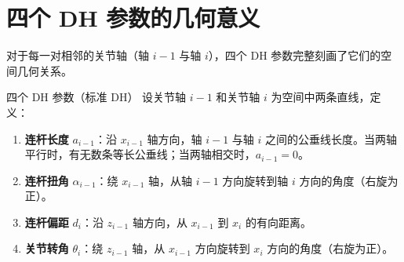 \section{四个 DH 参数的几何意义}

对于每一对相邻的关节轴（轴 $i-1$ 与轴 $i$），四个 DH 参数完整刻画了它们的空间几何关系。

\begin{mydefinition}{四个 DH 参数（标准 DH）}
	设关节轴 $i-1$ 和关节轴 $i$ 为空间中两条直线，定义：
	\begin{enumerate}
		\item \textbf{连杆长度} $a_{i-1}$：沿 $x_{i-1}$ 轴方向，轴 $i-1$ 与轴 $i$ 之间的公垂线长度。当两轴平行时，有无数条等长公垂线；当两轴相交时，$a_{i-1}=0$。\\
		\item \textbf{连杆扭角} $\alpha_{i-1}$：绕 $x_{i-1}$ 轴，从轴 $i-1$ 方向旋转到轴 $i$ 方向的角度（右旋为正）。\\
		\item \textbf{连杆偏距} $d_i$：沿 $z_{i-1}$ 轴方向，从 $x_{i-1}$ 到 $x_i$ 的有向距离。\\
		\item \textbf{关节转角} $\theta_i$：绕 $z_{i-1}$ 轴，从 $x_{i-1}$ 方向旋转到 $x_i$ 方向的角度（右旋为正）。
	\end{enumerate}
\end{mydefinition}

